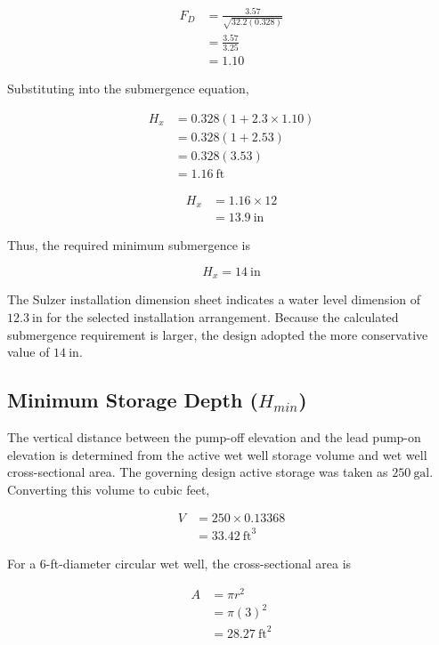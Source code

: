 \[
\begin{aligned}
F_D &= \frac{3.57}{\sqrt{32.2(0.328)}} \\
&= \frac{3.57}{3.25} \\
&= 1.10
\end{aligned}
\]

Substituting into the submergence equation,

\[
\begin{aligned}
H_x &= 0.328(1+2.3\times 1.10) \\
&= 0.328(1+2.53) \\
&= 0.328(3.53) \\
&= 1.16~\text{ft}
\end{aligned}
\]

\[
\begin{aligned}
H_x &= 1.16\times 12 \\
&= 13.9~\text{in}
\end{aligned}
\]

Thus, the required minimum submergence is

\[
\boxed{H_x=14~\text{in}}
\]

The Sulzer installation dimension sheet indicates a water level dimension of $12.3~\text{in}$ for the selected installation arrangement. Because the calculated submergence requirement is larger, the design adopted the more conservative value of $14~\text{in}$.

\subsection{Minimum Storage Depth ($H_{min}$)}

The vertical distance between the pump-off elevation and the lead pump-on elevation is determined from the active wet well storage volume and wet well cross-sectional area. The governing design active storage was taken as $250~\text{gal}$. Converting this volume to cubic feet,

\[
\begin{aligned}
V &= 250\times 0.13368 \\
&= 33.42~\text{ft}^3
\end{aligned}
\]

For a $6$-ft-diameter circular wet well, the cross-sectional area is

\[
\begin{aligned}
A &= \pi r^2 \\
&= \pi(3)^2 \\
&= 28.27~\text{ft}^2
\end{aligned}
\]

